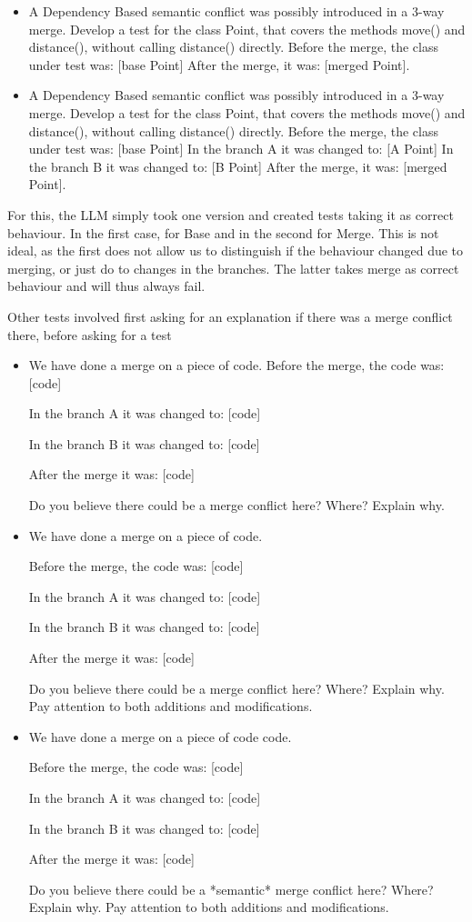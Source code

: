 \begin{itemize}
  \item A Dependency Based semantic conflict was possibly introduced in a 3-way merge. Develop a test for the class Point, that covers the methods move() and distance(), without calling distance() directly.
Before the merge, the class under test was: [base Point]
After the merge, it was: [merged Point].
  \item A Dependency Based semantic conflict was possibly introduced in a 3-way merge. Develop a test for the class Point, that covers the methods move() and distance(), without calling distance() directly.
Before the merge, the class under test was: [base Point]
In the branch A it was changed to: [A Point]
In the branch B it was changed to: [B Point]
After the merge, it was: [merged Point].

\end{itemize}

For this, the LLM simply took one version and created tests taking it as correct behaviour. In the first case, for Base and in the second for Merge. This is not ideal, as the first does not allow us to distinguish if the behaviour changed due to merging, or just do to changes in the branches. The latter takes merge as correct behaviour and will thus always fail.

Other tests involved first asking for an explanation if there was a merge conflict there, before asking for a test

\begin{itemize}
  \item We have done a merge on a piece of code.
Before the merge, the code was: [code]

In the branch A it was changed to: [code]

In the branch B it was changed to: [code]

After the merge it was: [code]

Do you believe there could be a merge conflict here? Where? Explain why.
  \item We have done a merge on a piece of code.
  
Before the merge, the code was: [code]

In the branch A it was changed to: [code]

In the branch B it was changed to: [code]

After the merge it was: [code]

Do you believe there could be a merge conflict here? Where? Explain why. Pay attention to both additions and modifications.
  \item We have done a merge on a piece of code code.
  
Before the merge, the code was: [code]

In the branch A it was changed to: [code]

In the branch B it was changed to: [code]

After the merge it was: [code]

Do you believe there could be a *semantic* merge conflict here? Where? Explain why. Pay attention to both additions and modifications.

\end{itemize}

